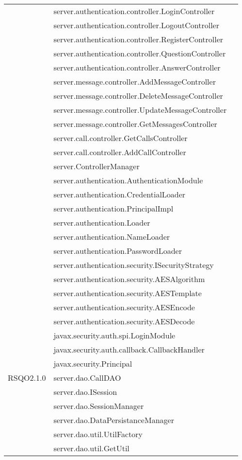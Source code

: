 \begin{center}
\begin{longtable}{lp{}l}
& server.authentication.controller.LoginController\\
& server.authentication.controller.LogoutController\\
& server.authentication.controller.RegisterController\\
& server.authentication.controller.QuestionController\\
& server.authentication.controller.AnswerController\\
& server.message.controller.AddMessageController\\
& server.message.controller.DeleteMessageController\\
& server.message.controller.UpdateMessageController\\
& server.message.controller.GetMessagesController\\
& server.call.controller.GetCallsController\\
& server.call.controller.AddCallController\\
& server.ControllerManager\\
& server.authentication.AuthenticationModule\\
& server.authentication.CredentialLoader\\
& server.authentication.PrincipalImpl\\
& server.authentication.Loader\\
& server.authentication.NameLoader\\
& server.authentication.PasswordLoader\\
& server.authentication.security.ISecurityStrategy\\
& server.authentication.security.AESAlgorithm\\
& server.authentication.security.AESTemplate\\
& server.authentication.security.AESEncode\\
& server.authentication.security.AESDecode\\
& javax.security.auth.spi.LoginModule\\
& javax.security.auth.callback.CallbackHandler\\
& javax.security.Principal\\
RSQO2.1.0 & server.dao.CallDAO\\
& server.dao.ISession\\
& server.dao.SessionManager\\
& server.dao.DataPersistanceManager\\
& server.dao.util.UtilFactory\\
& server.dao.util.GetUtil\\

\end{longtable}
\end{center}
